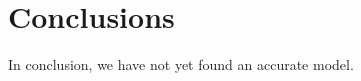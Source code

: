 \documentclass[aps, jcp, prl, reprint, groupedaddress, superscriptaddress, twocolumn]{revtex4-1}
\begin{document}
	

		


\section{Conclusions}
In conclusion, we have not yet found an accurate model.



%


\end{document}
